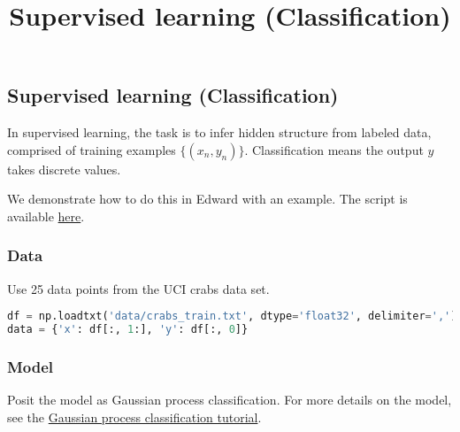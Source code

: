 \title{Supervised learning (Classification)}

\subsection{Supervised learning (Classification)}

In supervised learning, the task is to infer hidden structure from
labeled data, comprised of training examples $\{(x_n, y_n)\}$.
Classification means the output $y$ takes discrete values.

We demonstrate how to do this in Edward with an example.
The script is available
\href{https://github.com/blei-lab/edward/blob/master/examples/gp_classification.py}
{here}.


\subsubsection{Data}

Use 25 data points from the UCI crabs data set.
\begin{lstlisting}[language=Python]
df = np.loadtxt('data/crabs_train.txt', dtype='float32', delimiter=',')[:25, :]
data = {'x': df[:, 1:], 'y': df[:, 0]}
\end{lstlisting}


\subsubsection{Model}

Posit the model as Gaussian process classification. For more details on the
model, see the
\href{tut_gp_classification.html}
{Gaussian process classification tutorial}.

